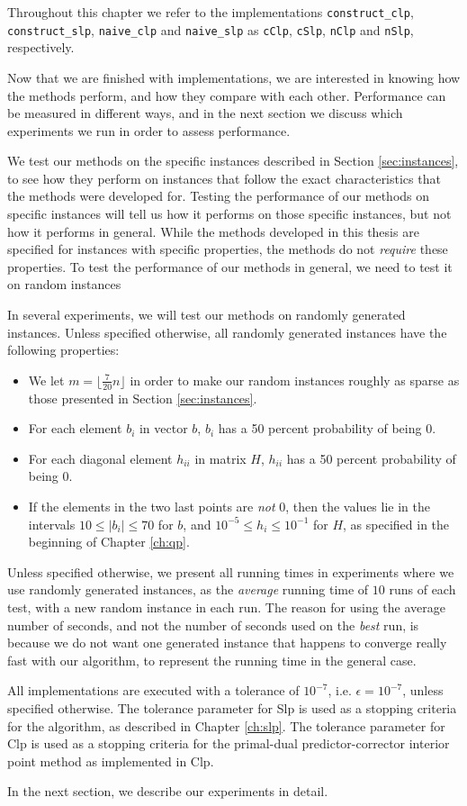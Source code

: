 Throughout this chapter we refer to the implementations \texttt{construct\_clp},
\texttt{construct\_slp}, \texttt{naive\_clp} and \texttt{naive\_slp} as
\texttt{cClp}, \texttt{cSlp}, \texttt{nClp} and \texttt{nSlp}, respectively.

Now that we are finished with implementations, we are interested in knowing
how the methods perform, and how they compare with each other.
Performance can be measured in different ways, and in the next section we
discuss which experiments we run in order to assess performance.

We test our methods on the specific instances described in
Section \ref{sec:instances}, to see how they perform on instances that follow
the exact characteristics that the methods were developed for.
Testing the performance of our methods on specific instances will tell us
how it performs on those specific instances, but not how it performs in general.
While the methods developed in this thesis are specified for instances with
specific properties, the methods do not \emph{require} these properties.
To test the performance of our methods in general, we need to test it
on random instances

In several experiments, we will test our methods on randomly generated
instances.
Unless specified otherwise, all randomly generated instances have
the following properties:
\begin{itemize}
\item We let $m = \lfloor \frac{7}{20}n \rfloor$ in order to make our random
      instances roughly as sparse as those presented in Section
      \ref{sec:instances}.
\item For each element $b_i$ in vector $b$, $b_i$ has a 50 percent probability of being 0.
\item For each diagonal element $h_{ii}$ in matrix $H$, $h_{ii}$ has a 50 percent
      probability of being 0.
\item If the elements in the two last points are \emph{not} 0, then the values lie in
      the intervals $10 \leq |b_i| \leq 70$ for $b$, and
      $10^{-5} \leq h_i \leq 10^{-1}$ for $H$, as specified in the beginning of
      Chapter \ref{ch:qp}.
\end{itemize}

Unless specified otherwise, we present all running times in experiments where
we use randomly generated instances, as the \emph{average} running time of
$10$ runs of each test, with a new random instance in each run.
The reason for using the average number of seconds, and
not the number of seconds used on the \emph{best} run, is because we do not want
one generated instance that happens to converge really fast with our algorithm,
to represent the running time in the general case.

All implementations are executed with a tolerance of $10^{-7}$, i.e.
$\epsilon = 10^{-7}$, unless specified otherwise.
The tolerance parameter for Slp is used as a stopping criteria for
the algorithm, as described in Chapter \ref{ch:slp}.
The tolerance parameter for Clp is used as a stopping criteria
for the primal-dual predictor-corrector interior point method as implemented
in Clp.

In the next section, we describe our experiments in detail.
